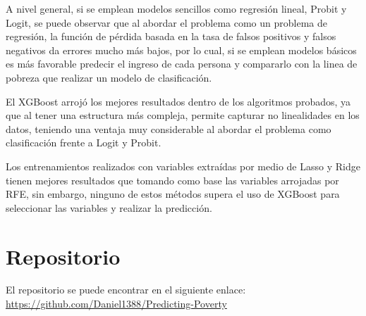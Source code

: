 \documentclass[11pt,a4paper]{article}
\begin{document}
A nivel general, si se emplean modelos sencillos como regresión lineal, Probit y Logit, se puede observar que al abordar el problema como un problema de regresión, la función de pérdida basada en la tasa de falsos positivos y falsos negativos da errores mucho más bajos, por lo cual, si se emplean modelos básicos es más favorable predecir el ingreso de cada persona y compararlo con la linea de pobreza que realizar un modelo de clasificación.

El XGBoost arrojó los mejores resultados dentro de los algoritmos probados, ya que al tener una estructura más compleja, permite capturar no linealidades en los datos, teniendo una ventaja muy considerable al abordar el problema como clasificación frente a Logit y Probit.

Los entrenamientos realizados con variables extraídas por medio de Lasso y Ridge tienen mejores resultados que tomando como base las variables arrojadas por RFE, sin embargo, ninguno de estos métodos supera el uso de XGBoost para seleccionar las variables y realizar la predicción.

\section{Repositorio}

El repositorio se puede encontrar en el siguiente enlace:\\ \url{https://github.com/Daniel1388/Predicting-Poverty} 




\end{document}
